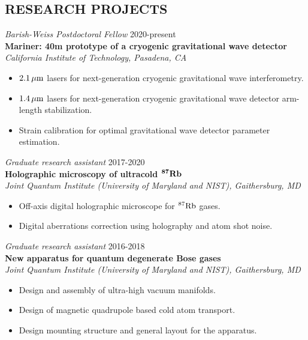 \documentclass[margin]{res} %
\begin{document}
\begin{resume}
\section{RESEARCH PROJECTS}

{\sl Barish-Weiss Postdoctoral Fellow} \hfill 2020-present \\
{\bf Mariner: 40m prototype of a cryogenic gravitational wave detector}\\
{\it California Institute of Technology, Pasadena, CA}
\begin{itemize} \itemsep -2pt
\item $2.1\,{\rm \mu m}$ lasers for next-generation cryogenic gravitational wave interferometry.
\item $1.4\,{\rm \mu m}$ lasers for next-generation cryogenic gravitational wave detector arm-length stabilization.
\item Strain calibration for optimal gravitational wave detector parameter estimation.
\end{itemize} 

{\sl Graduate research assistant} \hfill 2017-2020 \\
{\bf Holographic microscopy of ultracold ${\bf ^{87} {\rm \bf Rb}}$}\\
{\it Joint Quantum Institute (University of Maryland and NIST), Gaithersburg, MD}
\begin{itemize} \itemsep -2pt
\item Off-axis digital holographic microscope for ${^{87} {\rm Rb}}$ gases.
\item Digital aberrations correction using holography and atom shot noise.
\end{itemize} 

{\sl Graduate research assistant} \hfill 2016-2018 \\
{\bf New apparatus for quantum degenerate Bose gases}\\
{\it Joint Quantum Institute (University of Maryland and NIST), Gaithersburg, MD}
\begin{itemize} \itemsep -2pt
\item Design and assembly of ultra-high vacuum manifolds.
\item Design of magnetic quadrupole based cold atom transport.
\item Design mounting structure and general layout for the apparatus.
\end{itemize}


\end{resume}
\end{document}
